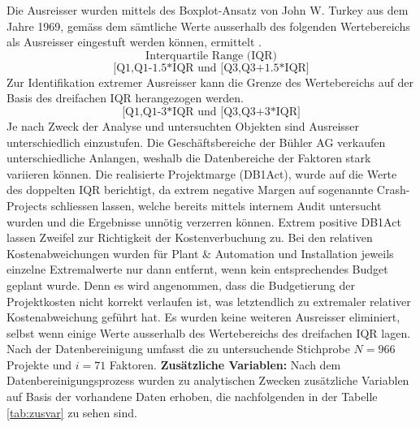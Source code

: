 \newline\newline
Die Ausreisser wurden mittels des Boxplot-Ansatz von John W. Turkey aus dem Jahre 1969, gemäss dem sämtliche Werte ausserhalb des folgenden Wertebereichs als Ausreisser eingestuft werden können, ermittelt \citep{lifengli16}.
\begin{equation*}
\text{Interquartile Range (IQR)}
\end{equation*}
\begin{equation*}
\text{[Q1,Q1-1.5*IQR und [Q3,Q3+1.5*IQR]}
\end{equation*}
Zur Identifikation extremer Ausreisser kann die Grenze des Wertebereichs auf der Basis des dreifachen IQR herangezogen werden.
\begin{equation*}
\text{[Q1,Q1-3*IQR und [Q3,Q3+3*IQR]}
\end{equation*}
Je nach Zweck der Analyse und untersuchten Objekten sind Ausreisser unterschiedlich einzustufen. Die Geschäftsbereiche der Bühler AG verkaufen unterschiedliche Anlangen, weshalb die Datenbereiche der Faktoren stark variieren können. Die realisierte Projektmarge (DB1Act), wurde auf die Werte des doppelten IQR berichtigt, da extrem negative Margen auf sogenannte Crash-Projects schliessen lassen, welche bereits mittels internem Audit untersucht wurden und die Ergebnisse unnötig verzerren können. Extrem positive DB1Act lassen Zweifel zur Richtigkeit der Kostenverbuchung zu. Bei den relativen Kostenabweichungen wurden für Plant \& Automation und Installation jeweils einzelne Extremalwerte nur dann entfernt, wenn kein entsprechendes Budget geplant wurde. Denn es wird angenommen, dass die Budgetierung der Projektkosten nicht korrekt verlaufen ist, was letztendlich zu extremaler relativer Kostenabweichung geführt hat. Es wurden keine weiteren Ausreisser eliminiert, selbst wenn einige Werte ausserhalb des Wertebereichs des dreifachen IQR lagen. Nach der Datenbereinigung umfasst die zu untersuchende Stichprobe $N = 966$ Projekte und $ i = 71$ Faktoren.
\newline\newline
\textbf{Zusätzliche Variablen:} Nach dem Datenbereinigungsprozess wurden zu analytischen Zwecken zusätzliche Variablen auf Basis der vorhandene Daten erhoben, die nachfolgenden in der Tabelle \ref{tab:zusvar} zu sehen sind.

